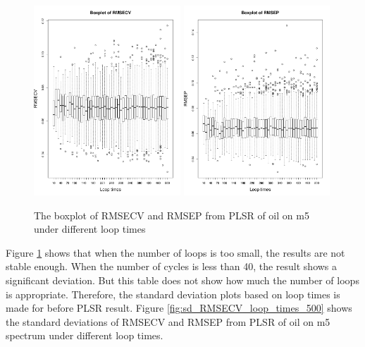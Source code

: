 \documentclass[a4paper,12pt,titlepage]{article} %
\numberwithin{equation}{section}  %
\begin{document}
	\begin{figure}[]    %
		\centering           %
		\includegraphics[width=5.5cm, angle=0]{boxplot_RMSECV_loop_times_500.pdf}  %
		\includegraphics[width=5.5cm, angle=0]{boxplot_RMSEP_loop_times_500.pdf} %
		\caption{The boxplot of RMSECV and RMSEP from PLSR of oil on m5 under different loop times}          %
		\label{fig:sd_RMSECV_RMSEP}               %
	\end{figure}                        %
	
	
	 Figure \ref{fig:sd_RMSECV_RMSEP} shows that when the number of loops is too small, the results are not stable enough. When the number of cycles is less than 40, the result shows a significant deviation. But this table does not show how much the number of loops is appropriate. Therefore, the standard deviation plots based on loop times is made for before PLSR result. Figure \ref{fig:sd_RMSECV_loop_times_500} shows the standard deviations of RMSECV and RMSEP from PLSR of oil on m5 spectrum under different loop times.
	 
\end{document}
